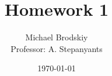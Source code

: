 


\title{Homework 1}
\date{\today}
\author{Michael Brodskiy\\ \small Professor: A. Stepanyants}



\maketitle

